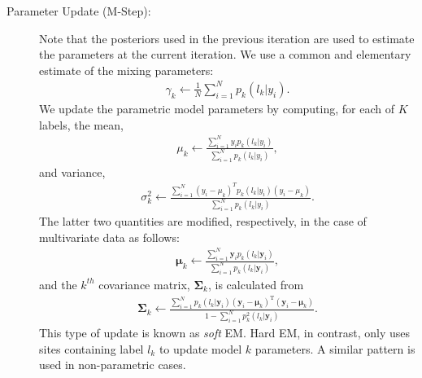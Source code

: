 \documentclass[11pt,english]{article}
\begin{document}
\begin{description}
\item[Parameter Update (M-Step):] 
Note that the posteriors used in the previous iteration are used to 
estimate the parameters at the current iteration.  
We use a common and elementary estimate of the mixing parameters:
\begin{align}
\gamma_k \leftarrow \frac{1}{N} \sum_{i=1}^N  p_k(l_k|y_i).
\end{align}
We update the parametric model parameters by computing, for each of
  $K$ labels, the mean,
\begin{align}  
 \mu_k \leftarrow \frac{ \sum_{i=1}^N  y_i p_k(l_k|y_i)}{ \sum_{i=1}^N p_k(l_k|y_i) },
\end{align}
and variance,
\begin{align}  
 \sigma^2_k \leftarrow  \frac{ \sum_{i=1}^N  (y_i - \mu_k )^T
   p_k(l_k|y_i) (y_i - \mu_k )}{ \sum_{i=1}^N p_k(l_k|y_i) }.
\end{align}
The latter two quantities are modified, respectively, in the case of multivariate data as follows:
\begin{align}
 \boldsymbol{\mu}_k \leftarrow \frac{ \sum_{i=1}^N  \mathbf{y}_i p_k(l_k|\mathbf{y}_i)}{ \sum_{i=1}^N p_k(l_k|\mathbf{y}_i) },
\end{align}
and the $k^{th}$ covariance matrix, $\boldsymbol{\Sigma}_k$, is calculated from
\begin{align}
 \boldsymbol{\Sigma}_{k} \leftarrow \frac{ \sum_{i=1}^N  p_k(l_k|\mathbf{y}_i) ( \mathbf{y}_{i} - \boldsymbol{\mu}_{k} )^{\mathrm{T}}  ( \mathbf{y}_{i} - \boldsymbol{\mu}_{k} )}{1 - \sum_{i=1}^N p^2_k(l_k|\mathbf{y}_{i}) }.
\end{align}
This type of update is known as {\em soft} EM.  Hard EM, in
contrast, only uses sites containing label $l_k$ to update model $k$ parameters.
A similar pattern is used in non-parametric cases.
\end{description}
\end{document}
